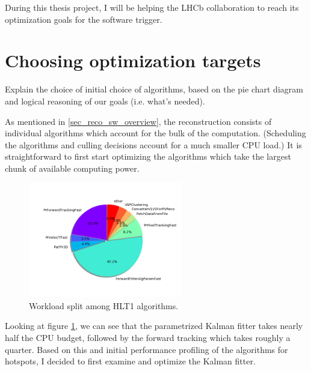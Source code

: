 \documentclass[12pt]{article}
\begin{document}
During this thesis project, I will be helping the LHCb collaboration to reach its optimization goals for the software trigger.

\newpage
\section{Choosing optimization targets}

\color{red}
Explain the choice of initial choice of algorithms, based on the pie chart diagram and logical reasoning of our goals (i.e. what's needed).
\color{black}

As mentioned in \ref{sec_reco_sw_overview}, the reconstruction consists of individual algorithms which account for the bulk of the computation. (Scheduling the algorithms and culling decisions account for a much smaller CPU load.) It is straightforward to first start optimizing the algorithms which take the largest chunk of available computing power.

\begin{figure}[H]
	\begin{center}
		\includegraphics[width=0.6\textwidth]{algo_usage_original_bestphys}
	\end{center}
	\caption{Workload split among HLT1 algorithms.}
	\label{fig_algo_usage_choice}
\end{figure}

Looking at figure \ref{fig_algo_usage_choice}, we can see that the parametrized Kalman fitter takes nearly half the CPU budget, followed by the forward tracking which takes roughly a quarter. Based on this and initial performance profiling of the algorithms for hotspots, I decided to first examine and optimize the Kalman fitter. 

\end{document}
